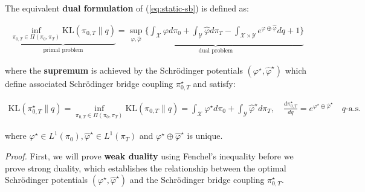 \documentclass{article}
\newcommand{\boldtext}[1]{\textbf{\textcolor{MyGreen}{#1}}}
\begin{document}
\begin{theorem}\label{theorem:dual-static-sb}
    The equivalent \textbf{dual formulation} of (\ref{eq:static-sb}) is defined as:
    \begin{small}
    \begin{align}
        \underbrace{\inf_{\pi_{0,T}\in \Pi(\pi_0, \pi_T)}\text{KL}(\pi_{0,T}\|q)}_{\text{primal problem}}=\underbrace{\sup_{\varphi, \hat{\varphi}}\bigg\{\int_{\mathcal{X}}\varphi d\pi_0+\int_{\mathcal{Y}}\hat{\varphi} d\pi_T-\int_{\mathcal{X}\times\mathcal{Y}} e^{\varphi\oplus \hat{\varphi}}dq+1\bigg\}}_{\text{dual problem}}\tag{Strong Duality}\label{eq:strong-duality}
    \end{align}
    \end{small}
    where the \textbf{supremum} is achieved by the Schrödinger potentials $(\varphi^\star, \hat{\varphi}^\star)$ which define associated Schrödinger bridge coupling $\pi^\star_{0,T}$ and satisfy:
    \begin{small}
    \begin{align}
        \text{KL}(\pi^\star_{0,T}\|q)=\inf_{\pi_{0,T}\in \Pi(\pi_0, \pi_T)}\text{KL}(\pi_{0,T}\|q)=\int_{\mathcal{X}}\varphi^\star d\pi_0+\int_{\mathcal{Y}}\hat{\varphi}^\star d\pi_T, \quad \frac{d\pi^\star_{0,T}}{dq}=e^{\varphi^\star\oplus\hat{\varphi}^\star} \quad q\text{-a.s.}
    \end{align}
    \end{small}
    where $\varphi^\star\in L^1(\pi_0), \hat{\varphi}^\star\in L^1(\pi_T)$ and $\varphi^\star\oplus \hat{\varphi}^\star$ is unique.
\end{theorem}

\textit{Proof.} First, we will prove \boldtext{weak duality} using Fenchel's inequality before we prove strong duality, which establishes the relationship between the optimal Schrödinger potentials $(\varphi^\star, \hat{\varphi}^\star)$ and the Schrödinger bridge coupling $\pi_{0,T}^\star$.
\end{document}
